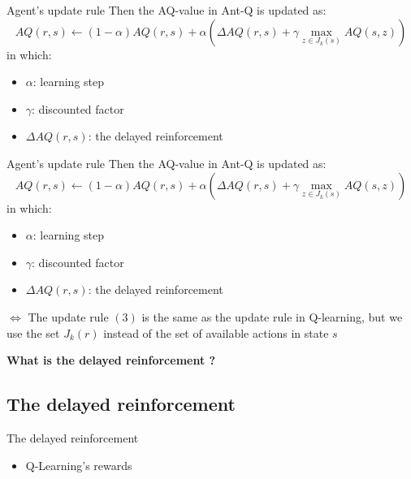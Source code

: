 \documentclass[aspectratio=169,xcolor=dvipsnames]{beamer}
\begin{document}
\begin{frame}{Agent's update rule}
    Then the AQ-value in Ant-Q is updated as:
    \begin{equation*}
        AQ(r,s) \leftarrow (1 - \alpha)AQ(r, s) + \alpha\left(\Delta AQ(r, s) + \gamma \max_{z\in J_k(s)}AQ(s, z)\right)
    \end{equation*}
    in which:
    \begin{itemize}
        \item $\alpha$: learning step 
        \item $\gamma$: discounted factor
        \item $\Delta AQ(r, s)$: the delayed reinforcement
    \end{itemize}
\end{frame}

\begin{frame}{Agent's update rule}
    Then the AQ-value in Ant-Q is updated as:
    \begin{equation}
        AQ(r,s) \leftarrow (1 - \alpha)AQ(r, s) + \alpha\left(\Delta AQ(r, s) + \gamma \max_{z\in J_k(s)}AQ(s, z)\right)
    \end{equation}
    in which:
    \begin{itemize}
        \item $\alpha$: learning step 
        \item $\gamma$: discounted factor
        \item $\Delta AQ(r, s)$: the delayed reinforcement
    \end{itemize}
    $\Leftrightarrow$ The update rule $(3)$ is the same as the update rule in Q-learning, but we use the set $J_k(r)$ instead of the set of available actions in state $s$
\end{frame}

\begin{frame}
    \huge\centering\textbf{What is the delayed reinforcement ?}
\end{frame}
\subsection{The delayed reinforcement}
\begin{frame}{The delayed reinforcement}
    \begin{itemize}
        \item Q-Learning's rewards 
    \end{itemize}
\end{frame}
\end{document}
